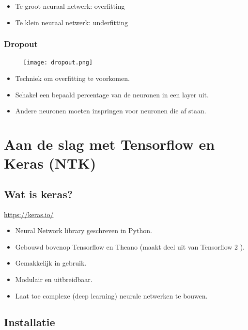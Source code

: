 \documentclass{article}
\begin{document}
\begin{itemize}
    \item Te groot neuraal netwerk: overfitting
    \item Te klein neuraal netwerk: underfitting
\end{itemize}


\subsubsection{Dropout}

\begin{figure}[H]
    \centering
    \texttt{[image: dropout.png]}
\end{figure}


\begin{itemize}
    \item Techniek om overfitting te voorkomen.
    \item Schakel een bepaald percentage van de neuronen in een layer uit.
    \item Andere neuronen moeten inspringen voor neuronen die af staan.
\end{itemize}

\section{Aan de slag met Tensorflow en Keras (NTK)}

\subsection{Wat is keras?}

\url{https://keras.io/}

\begin{itemize}
    \item Neural Network library geschreven in Python.
    \item Gebouwd bovenop Tensorflow en Theano (maakt deel uit van Tensorflow 2 ).
    \item Gemakkelijk in gebruik.
    \item Modulair en uitbreidbaar.
    \item Laat toe complexe (deep learning) neurale netwerken te bouwen.
\end{itemize}

\subsection{Installatie}
\end{document}
